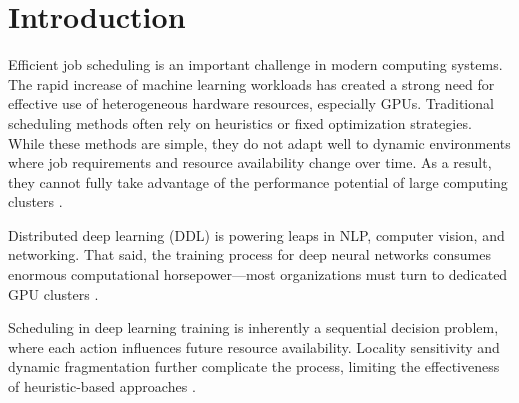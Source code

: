 \documentclass{article}
\begin{document}
\section{Introduction}
Efficient job scheduling is an important challenge in modern computing systems. The rapid increase of machine learning workloads has created a strong need for effective use of heterogeneous hardware resources, especially GPUs. Traditional scheduling methods often rely on heuristics or fixed optimization strategies. While these methods are simple, they do not adapt well to dynamic environments where job requirements and resource availability change over time. As a result, they cannot fully take advantage of the performance potential of large computing clusters \cite{luo2025prediction}.

Distributed deep learning (DDL) is powering leaps in NLP, computer vision, and networking. That said, the training process for deep neural networks consumes enormous computational horsepower—most organizations must turn to dedicated GPU clusters \cite{weng2022mlaas}.

Scheduling in deep learning training is inherently a sequential decision problem, where each action influences future resource availability. Locality sensitivity and dynamic fragmentation further complicate the process, limiting the effectiveness of heuristic-based approaches \cite{luan2019sched2}.
\end{document}
